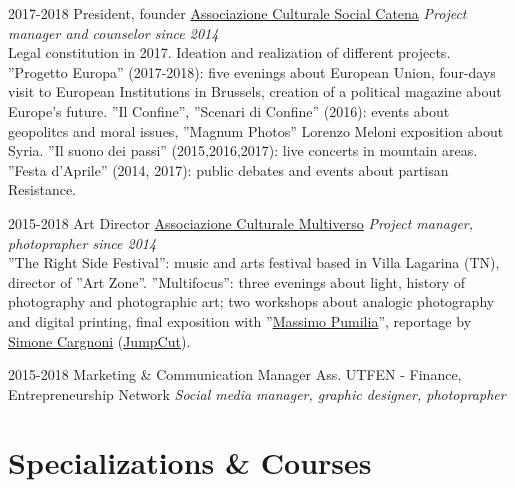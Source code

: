 \documentclass[]{friggeri-cv}
\begin{document}
\begin{entrylist}

\entry
    {2017-2018}
    {President, founder}
    {\href{https://www.facebook.com/SocialCatena/}{Associazione Culturale Social Catena}}
    {\emph{Project manager and counselor since 2014}\\
    Legal constitution in 2017. Ideation and realization of different projects. ''Progetto Europa'' (2017-2018): five evenings about European Union, four-days visit to European Institutions in Brussels, creation of a political magazine about Europe's future. ''Il Confine'', ''Scenari di Confine'' (2016): events about geopolitcs and moral issues, ''Magnum Photos'' Lorenzo Meloni exposition about Syria. ''Il suono dei passi'' (2015,2016,2017): live concerts in mountain areas. ''Festa d’Aprile'' (2014, 2017): public debates and events about partisan Resistance.
    }

\entry
    {2015-2018}
    {Art Director}
    {\href{https://www.facebook.com/Asso.Multiverso/}{Associazione Culturale Multiverso}}
    {\emph{Project manager, photoprapher since 2014}\\
    ''The Right Side Festival'': music and arts festival based in Villa Lagarina (TN), director of ''Art Zone''. ''Multifocus'': three evenings about light, history of photography and photographic art; two workshops about analogic photography and digital printing, final exposition with ''\href{http://simonecargnoni.com/massimopumilia/}{Massimo Pumilia}'', reportage by \href{http://simonecargnoni.com}{Simone Cargnoni} (\href{http://www.jumpcut.it}{JumpCut}).
    }

\entry
    {2015-2018}
    {Marketing \& Communication Manager}
    {Ass. UTFEN - Finance, Entrepreneurship Network}
    {\emph{Social media manager, graphic designer, photoprapher}}

\end{entrylist}


\section{Specializations \& Courses}
\end{document}
